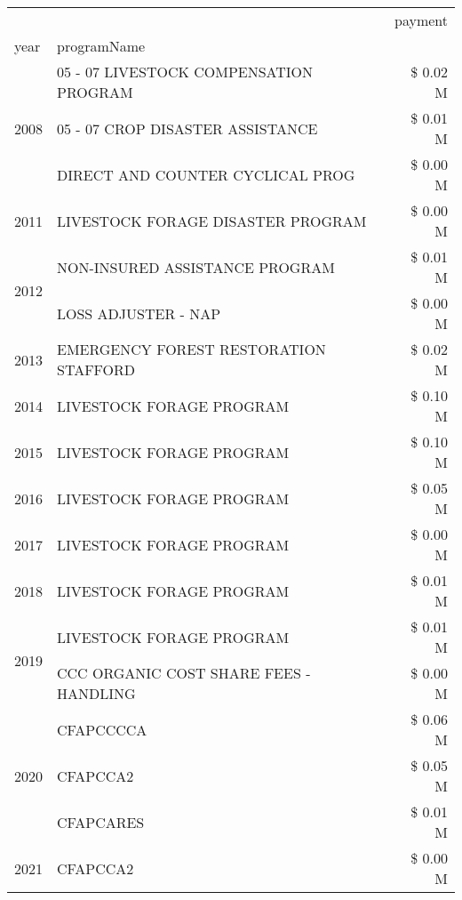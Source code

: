 \begin{tabular}{llr}
\toprule
 &  & payment \\
year & programName &  \\
\midrule
\multirow[t]{3}{*}{2008} & 05 - 07 LIVESTOCK COMPENSATION PROGRAM & \$ 0.02 M \\
 & 05 - 07 CROP DISASTER ASSISTANCE & \$ 0.01 M \\
 & DIRECT AND COUNTER CYCLICAL PROG & \$ 0.00 M \\
\cline{1-3}
2011 & LIVESTOCK FORAGE DISASTER PROGRAM & \$ 0.00 M \\
\cline{1-3}
\multirow[t]{2}{*}{2012} & NON-INSURED ASSISTANCE PROGRAM & \$ 0.01 M \\
 & LOSS ADJUSTER - NAP & \$ 0.00 M \\
\cline{1-3}
2013 & EMERGENCY FOREST RESTORATION STAFFORD & \$ 0.02 M \\
\cline{1-3}
2014 & LIVESTOCK FORAGE PROGRAM & \$ 0.10 M \\
\cline{1-3}
2015 & LIVESTOCK FORAGE PROGRAM & \$ 0.10 M \\
\cline{1-3}
2016 & LIVESTOCK FORAGE PROGRAM & \$ 0.05 M \\
\cline{1-3}
2017 & LIVESTOCK FORAGE PROGRAM & \$ 0.00 M \\
\cline{1-3}
2018 & LIVESTOCK FORAGE PROGRAM & \$ 0.01 M \\
\cline{1-3}
\multirow[t]{2}{*}{2019} & LIVESTOCK FORAGE PROGRAM & \$ 0.01 M \\
 & CCC ORGANIC COST SHARE FEES - HANDLING & \$ 0.00 M \\
\cline{1-3}
\multirow[t]{3}{*}{2020} & CFAPCCCCA & \$ 0.06 M \\
 & CFAPCCA2 & \$ 0.05 M \\
 & CFAPCARES & \$ 0.01 M \\
\cline{1-3}
2021 & CFAPCCA2 & \$ 0.00 M \\
\cline{1-3}
\bottomrule
\end{tabular}
